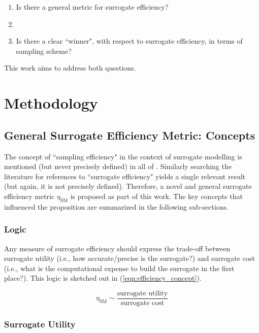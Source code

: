 \documentclass[conference]{IEEEtran}
\begin{document}
\begin{enumerate}
	\item Is there a general metric for surrogate efficiency?
	\item []
	\item Is there a clear ``winner", with respect to surrogate efficiency, in terms of sampling scheme?
\end{enumerate}

\noindent This work aims to address both questions.

\section{Methodology}

\subsection{General Surrogate Efficiency Metric: Concepts}

The concept of ``sampling efficiency" in the context of surrogate modelling is mentioned (but never precisely defined) in all of \cite{Gong_2017, Westermann_2019_2, Yin_2011}. Similarly searching the literature for references to ``surrogate efficiency" yields a single relevant result \cite{Casper_2016} (but again, it is not precisely defined). Therefore, a novel and general surrogate efficiency metric $\eta_\textrm{SM}$ is proposed as part of this work. The key concepts that influenced the proposition are summarized in the following sub-sections.

\subsubsection{Logic}

Any measure of surrogate efficiency should express the trade-off between surrogate utility (i.e., how accurate/precise is the surrogate?) and surrogate cost (i.e., what is the computational expense to build the surrogate in the first place?). This logic is sketched out in (\ref{eqn:efficiency_concept}).

\begin{equation}
	\eta_\textrm{SM} \sim \frac{\textrm{surrogate utility}}{\textrm{surrogate cost}}
	\label{eqn:efficiency_concept}
\end{equation}

\subsubsection{Surrogate Utility}
\end{document}
